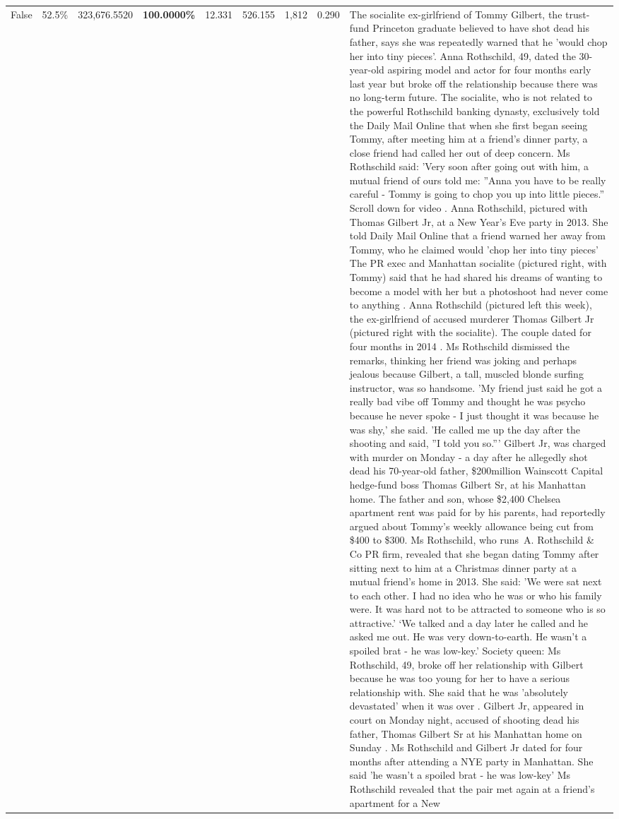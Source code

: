 \begin{table}[H]
\begin{tabular}{lllrlllll}
False & 52.5\% & 323,676.5520 & \bfseries \color{red} 100.0000\% & 12.331 & 526.155 & 1,812 & 0.290 & The socialite ex-girlfriend of Tommy Gilbert, the trust-fund Princeton graduate believed to have shot dead his father, says she was repeatedly warned that he 'would chop her into tiny pieces'. Anna Rothschild, 49, dated the 30-year-old aspiring model and actor for four months early last year but broke off the relationship because there was no long-term future. The socialite, who is not related to the powerful Rothschild banking dynasty, exclusively told the Daily Mail Online that when she first began seeing Tommy, after meeting him at a friend's dinner party, a close friend had called her out of deep concern. Ms Rothschild said: 'Very soon after going out with him, a mutual friend of ours told me: ''Anna you have to be really careful - Tommy is going to chop you up into little pieces.'' Scroll down for video . Anna Rothschild, pictured with Thomas Gilbert Jr, at a New Year's Eve party in 2013. She told Daily Mail Online that a friend warned her away from Tommy, who he claimed would 'chop her into tiny pieces' The PR exec and Manhattan socialite (pictured right, with Tommy) said that he had shared his dreams of wanting to become a model with her but a photoshoot had never come to anything . Anna Rothschild (pictured left this week), the ex-girlfriend of accused murderer Thomas Gilbert Jr (pictured right with the socialite). The couple dated for four months in 2014 . Ms Rothschild dismissed the remarks, thinking her friend was joking and perhaps jealous because Gilbert, a tall, muscled blonde surfing instructor, was so handsome. 'My friend just said he got a really bad vibe off Tommy and thought he was psycho because he never spoke - I just thought it was because he was shy,' she said. 'He called me up the day after the shooting and said, ''I told you so.''' Gilbert Jr, was charged with murder on Monday - a day after he allegedly shot dead his 70-year-old father, \$200million Wainscott Capital hedge-fund boss Thomas Gilbert Sr, at his Manhattan home. The father and son, whose \$2,400 Chelsea apartment rent was paid for by his parents, had reportedly argued about Tommy's weekly allowance being cut from \$400 to \$300. Ms Rothschild, who runs A. Rothschild \& Co PR firm, revealed that she began dating Tommy after sitting next to him at a Christmas dinner party at a mutual friend's home in 2013. She said: 'We were sat next to each other. I had no idea who he was or who his family were. It was hard not to be attracted to someone who is so attractive.' ‘We talked and a day later he called and he asked me out. He was very down-to-earth. He wasn’t a spoiled brat - he was low-key.’ Society queen: Ms Rothschild, 49, broke off her relationship with Gilbert because he was too young for her to have a serious relationship with. She said that he was 'absolutely devastated' when it was over . Gilbert Jr, appeared in court on Monday night, accused of shooting dead his father, Thomas Gilbert Sr at his Manhattan home on Sunday . Ms Rothschild and Gilbert Jr dated for four months after attending a NYE party in Manhattan. She said 'he wasn't a spoiled brat - he was low-key' Ms Rothschild revealed that the pair met again at a friend’s apartment for a New 
\end{tabular}
\end{table}
